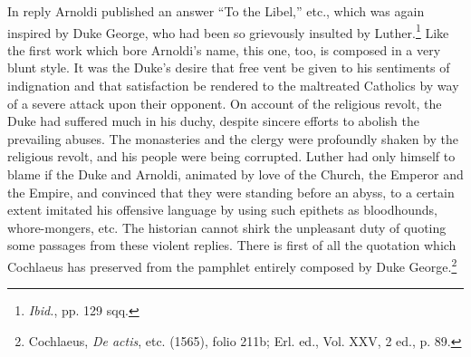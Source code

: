 In reply Arnoldi published an answer “To the Libel,” etc., which
was again inspired by Duke George, who had been so grievously insulted
by Luther.\footnote{\textit{Ibid.}, pp. 129 sqq.}
 Like the first work which bore Arnoldi’s name,
this one, too, is composed in a very blunt style. It was the Duke’s desire
that free vent be given to his sentiments of indignation and that
satisfaction be rendered to the maltreated Catholics by way of a severe
attack upon their opponent. On account of the religious revolt, the
Duke had suffered much in his duchy, despite sincere efforts to abolish
the prevailing abuses. The monasteries and the clergy were profoundly
shaken by the religious revolt, and his people were being corrupted.
Luther had only himself to blame if the Duke and Arnoldi, animated
by love of the Church, the Emperor and the Empire, and convinced
that they were standing before an abyss, to a certain extent imitated
his offensive language by using such epithets as bloodhounds, whore-mongers,
etc. The historian cannot shirk the unpleasant duty of quoting
some passages from these violent replies. There is first of all the
quotation which Cochlaeus has preserved from the pamphlet entirely
composed by Duke George.\footnote
{Cochlaeus, \textit{De actis}, etc. (1565), folio 211b; Erl. ed., Vol. XXV, 2 ed., p. 89.}
